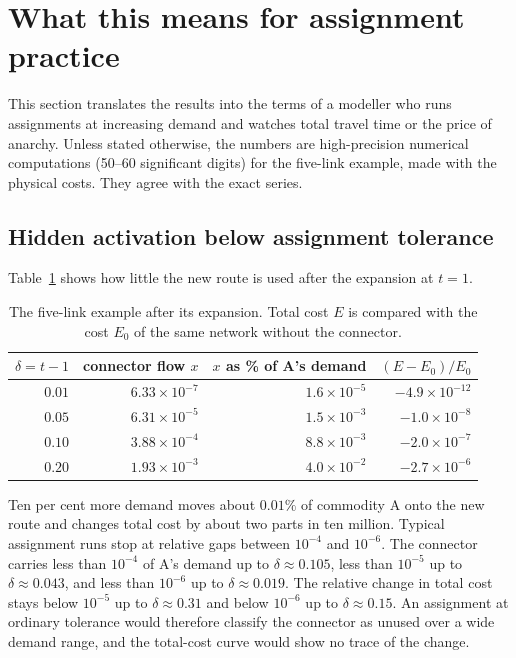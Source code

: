\section{What this means for assignment practice}\label{sec:practice}

This section translates the results into the terms of a modeller who runs assignments at increasing demand and watches total travel time or the price of anarchy. Unless stated otherwise, the numbers are high-precision numerical computations (50--60 significant digits) for the five-link example, made with the physical costs. They agree with the exact series.

\subsection{Hidden activation below assignment tolerance}

Table~\ref{tab:hidden} shows how little the new route is used after the expansion at $t=1$.

\begin{table}[htbp]
\centering\small
\begin{tabular}{rrrr}
\toprule
$\delta=t-1$ & connector flow $x$ & $x$ as \% of A's demand & $(E-E_0)/E_0$\\
\midrule
$0.01$ & $6.33\times10^{-7}$ & $1.6\times10^{-5}$ & $-4.9\times10^{-12}$\\
$0.05$ & $6.31\times10^{-5}$ & $1.5\times10^{-3}$ & $-1.0\times10^{-8}$\\
$0.10$ & $3.88\times10^{-4}$ & $8.8\times10^{-3}$ & $-2.0\times10^{-7}$\\
$0.20$ & $1.93\times10^{-3}$ & $4.0\times10^{-2}$ & $-2.7\times10^{-6}$\\
\bottomrule
\end{tabular}
\caption{The five-link example after its expansion. Total cost $E$ is compared with the cost $E_0$ of the same network without the connector. }
\label{tab:hidden}
\end{table}

Ten per cent more demand moves about $0.01\%$ of commodity A onto the new route and changes total cost by about two parts in ten million. Typical assignment runs stop at relative gaps between $10^{-4}$ and $10^{-6}$. The connector carries less than $10^{-4}$ of A's demand up to $\delta\approx0.105$, less than $10^{-5}$ up to $\delta\approx0.043$, and less than $10^{-6}$ up to $\delta\approx0.019$. The relative change in total cost stays below $10^{-5}$ up to $\delta\approx0.31$ and below $10^{-6}$ up to $\delta\approx0.15$. An assignment at ordinary tolerance would therefore classify the connector as unused over a wide demand range, and the total-cost curve would show no trace of the change.

